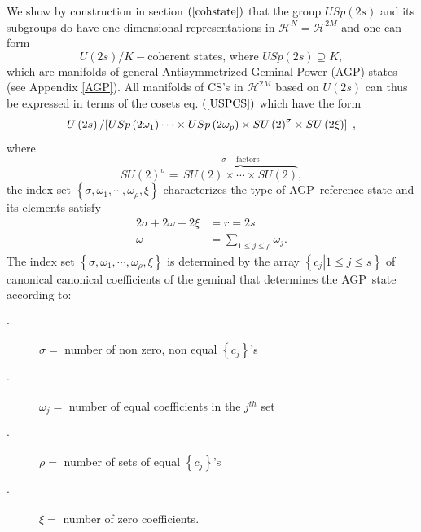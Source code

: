 \documentclass[aps,preprint]{revtex4}%
\begin{document}
We show by construction in section $\left(  \ref{cohstate}\right)  $ that the
group $USp\left(  2s\right)  $ and its subgroups do have one dimensional
representations in $\mathcal{H}^{N}=\mathcal{H}^{2M}$ and one can form
\begin{equation}
U\left(  2s\right)  /K-\text{coherent states, where }USp\left(  2s\right)
\supseteq K, \label{USPCS}%
\end{equation}
which are manifolds of general Antisymmetrized Geminal Power (AGP) states (see
Appendix \ref{AGP}). All manifolds of CS's in $\mathcal{H}^{2M}$ based on
$U\left(  2s\right)  $ can thus be expressed in terms of the cosets eq.
$\left(  \ref{USPCS}\right)  $ which have the form
\begin{equation}
U\left(  2s\right)  \left/  \left[  USp\left(  2\omega_{1}\right)
\cdots\times USp\left(  2\omega_{p}\right)  \times SU\left(  2\right)
^{\sigma}\times SU\left(  2\xi\right)  \right]  \overset{}{}\right.  ,
\end{equation}
where
\begin{equation}
SU\left(  2\right)  ^{\sigma}=\,\overset{\sigma-\text{factors}}{\overbrace
{SU\left(  2\right)  \times\cdots\times SU\left(  2\right)  }},
\end{equation}
the index set $\left\{  \sigma,\omega_{1},\cdots,\omega_{\rho},\xi\right\}  $
characterizes the type of AGP\ reference state and its elements satisfy
\begin{align}
2\sigma+2\omega+2\xi &  =r=2s\nonumber\\
\omega &  =\sum_{1\leq j\leq\rho}\omega_{j}.
\end{align}
The index set $\left\{  \sigma,\omega_{1},\cdots,\omega_{\rho},\xi\right\}  $
is determined by the array $\left\{  \left.  c_{j}\right\vert 1\leq j\leq
s\right\}  $ of canonical canonical coefficients \cite{Weiner&ortiz04} of the
geminal that determines the AGP\ state according to:

\begin{description}
\item[$\cdot$] $\sigma=$ number of non zero, non equal $\left\{
c_{j}\right\}  $'s

\item[$\cdot$] $\omega_{j}=$ number of equal coefficients in the $j^{th}$ set

\item[$\cdot$] $\rho=$ number of sets of equal $\left\{  c_{j}\right\}  $'s

\item[$\cdot$] $\xi=$ number of zero coefficients.
\end{description}
\end{document}
